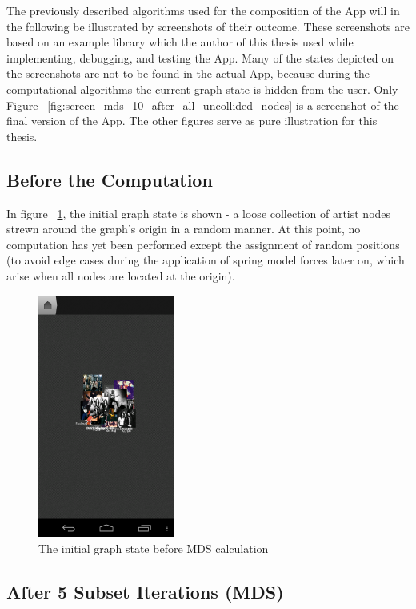 The previously described algorithms used for the composition of the App will in the following be  illustrated by screenshots of their outcome. These screenshots are based on an example library which the author of this thesis used while implementing, debugging, and testing the App. Many of the states depicted on the screenshots are not to be found in the actual App, because during the computational algorithms the current graph state is hidden from the user. Only Figure ~\ref{fig:screen_mds_10_after_all_uncollided_nodes} is a screenshot of the final version of the App. The other figures serve as pure illustration for this thesis.

\subsection{Before the Computation}

In figure ~\ref{fig:screen_mds_1_initial}, the initial graph state is shown - a loose collection of artist nodes strewn around the graph's origin in a random manner. At this point, no computation has yet been performed except the assignment of random positions (to avoid edge cases during the application of spring model forces later on, which arise when all nodes are located at the origin).

\begin{figure}[H]
  \centering
    \includegraphics[width=0.4\textwidth]{figures/screen_mds_1_initial}
  \caption{The initial graph state before MDS calculation}
  \label{fig:screen_mds_1_initial}
\end{figure}

\newpage
\subsection{After 5 Subset Iterations (MDS)}
\label{subsec:mds-after-five-subset-iterations}


